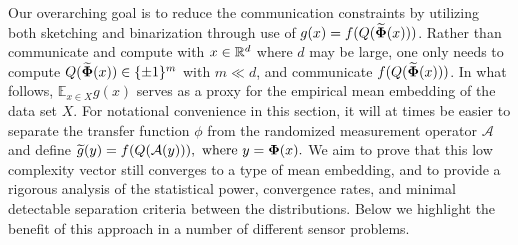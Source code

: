 Our overarching goal is to reduce the communication constraints by utilizing both sketching and binarization 
through use of $g(x) = f(Q(\widetilde{\mathbf{\Phi}}(x)))$.   
Rather than communicate and compute with $x\in \mathbb{R}^d$ where $d$ may be large, one only needs to compute $Q(\widetilde{\mathbf{\Phi}}(x))\in \{\pm 1\}^m$ with $m\ll d$, and communicate $f(Q(\widetilde{\mathbf{\Phi}}(x)))$. In what follows, $\mathbb{E}_{x\in X} g(x)$ serves as a proxy for the empirical mean embedding of the data set $X$.  For notational convenience in this section, it will at times be easier to separate the transfer function $\phi$ from the randomized measurement operator $\mathcal{A}$ and define
$     \widetilde{g}(y) = f(Q(\mathcal{A}(y))),  \textnormal{ where } y=\mathbf{\Phi}(x).$
We aim to prove that this low complexity vector still converges to a type of mean embedding, and to provide a rigorous analysis of the statistical power, convergence rates, and minimal detectable separation criteria between the distributions.  Below we highlight the benefit of this approach in a number of different sensor problems. 

